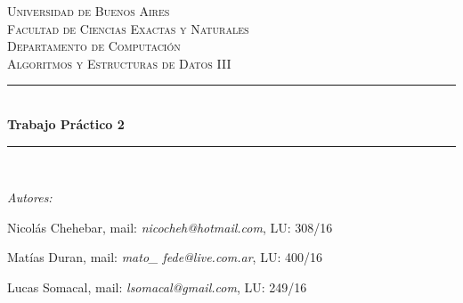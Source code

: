 \documentclass[A4paper,oneside,fleqn,11pt]{article}
\theoremstyle{definition}
\begin{document}

\begin{titlepage}

\center %

\newcommand{\HRule}{\rule{\linewidth}{0.5mm}} %

\textsc{\LARGE Universidad de Buenos Aires}\\[1.5cm] %
\textsc{\Large Facultad de Ciencias Exactas y Naturales}\\[0.5cm] %
\textsc{\large Departamento de Computación}\\[0.5cm] %
\textsc{\large Algoritmos y Estructuras de Datos III}\\[0.5cm] %

\HRule \\[0.8cm]
{ \huge \bfseries Trabajo Práctico 2}\\[0.4cm] %
\HRule \\[1.5cm]

\begin{minipage}{0.8\textwidth}
\center
\Large
\emph{Autores:}


{Nicolás Chehebar, mail: \textit{nicocheh@hotmail.com}, LU: 308/16 

Matías Duran, mail: \textit{mato\_ fede@live.com.ar}, LU: 400/16 

Lucas Somacal, mail: \textit{lsomacal@gmail.com}, LU: 249/16} %
~
\end{minipage}\\[4cm]


\vfill %

\end{titlepage}

\end{document}
